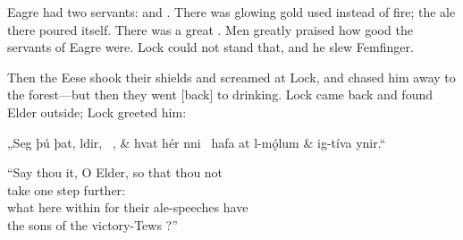 Eagre had two servants:  and . There was glowing gold used instead of fire; the ale there poured itself. There was a great . Men greatly praised how good the servants of Eagre were. Lock could not stand that, and he slew Femfinger.

Then the Eese shook their shields and screamed at Lock, and chased him away to the forest—but then they went [back] to drinking. Lock came back and found Elder outside; Lock greeted him:\epb\epg

\sectionline

\bvg
\bva „Seg þú þat, ldir, \hld\ , &
hvat hér nni \hld\ hafa at l-mǫ́lum &
\ind {}ig-tíva ynir.“\eva

\bvb “Say thou it, O Elder, so that thou not \\
take one step further: \\
what here within for their ale-speeches have \\
the sons of the victory-Tews ?”\evb
\evg


